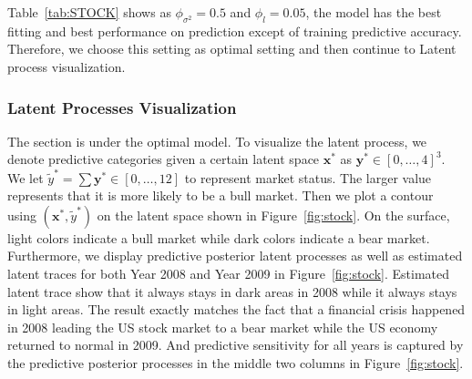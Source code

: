 \documentclass{article}
\begin{document}
Table~\ref{tab:STOCK} shows as $\phi_{\sigma^2} = 0.5$ and $\phi_l = 0.05$, the model has the best fitting and best performance on prediction except of training predictive accuracy. Therefore, we choose this setting as optimal setting and then continue to Latent process visualization.




\subsubsection{Latent Processes Visualization}
The section is under the optimal model. To visualize the latent process, we denote predictive categories given a certain latent space $\bm x^*$ as $\bm y^* \in [0,\ldots,4]^3$. We let $\tilde{y}^* = \sum \bm y^* \in [0, \ldots, 12]$ to represent market status. The larger value represents that it is more likely to be a bull market. Then we plot a contour using $(\bm x^*, \tilde{y}^*)$ on the latent space shown in Figure~\ref{fig:stock}. On the surface, light colors indicate a bull market while dark colors indicate a bear market. Furthermore, we display predictive posterior latent processes as well as estimated latent traces for both Year 2008 and Year 2009 in Figure~\ref{fig:stock}. Estimated latent trace show that it always stays in dark areas in 2008 while it always stays in light areas. The result exactly matches the fact that a financial crisis happened in 2008 leading the US stock market to a bear market while the US economy returned to normal in 2009. And predictive sensitivity for all years is captured by the predictive posterior processes in the middle two columns in Figure~\ref{fig:stock}.
\end{document}
